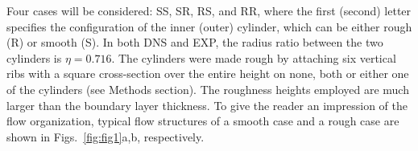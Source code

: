 \documentclass[aps,prl,superscriptaddress,preprint]{revtex4}
\newcommand{\blue}[1]{{\textcolor{blue}{#1}}}
\newcommand{\annotation}[1]{\blue{[\textit{#1}]}}
\begin{document}
 
Four cases will be considered: SS, SR, RS, and RR, where the first (second) letter specifies the configuration of the inner (outer) cylinder, which can be either rough (R) or smooth (S). In both DNS and EXP, the radius ratio between the two cylinders is $\eta=0.716$. The cylinders were made rough by attaching six vertical ribs with a square cross-section over the entire height on none, both or either one of the
cylinders (see Methods section). The roughness heights employed are much larger than the
boundary layer thickness. 
To give the reader an impression of the flow organization, 
 typical flow structures of a smooth case and a rough case are shown  in Figs.\ \ref{fig:fig1}a,b, respectively.


\end{document}
